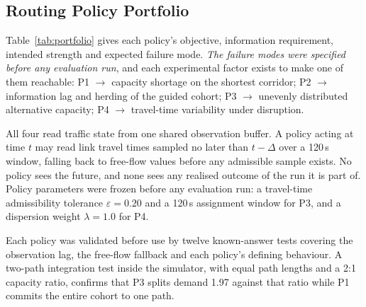 \documentclass[runningheads]{llncs}
\begin{document}
\subsection{Routing Policy Portfolio}

Table~\ref{tab:portfolio} gives each policy's objective, information
requirement, intended strength and expected failure mode. \emph{The failure
modes were specified before any evaluation run}, and each experimental factor
exists to make one of them reachable: P1 $\rightarrow$ capacity shortage on the
shortest corridor; P2 $\rightarrow$ information lag and herding of the guided
cohort; P3 $\rightarrow$ unevenly distributed alternative capacity;
P4 $\rightarrow$ travel-time variability under disruption.

All four read traffic state from one shared observation buffer. A policy acting
at time $t$ may read link travel times sampled no later than $t-\Delta$ over a
120\,s window, falling back to free-flow values before any admissible sample
exists. No policy sees the future, and none sees any realised outcome of the
run it is part of. Policy parameters were frozen before any evaluation run: a
travel-time admissibility tolerance $\varepsilon=0.20$ and a 120\,s
assignment window for P3, and a dispersion weight $\lambda=1.0$ for P4.

Each policy was validated before use by twelve known-answer tests covering the
observation lag, the free-flow fallback and each policy's defining behaviour. A
two-path integration test inside the simulator, with equal path lengths and a
2:1 capacity ratio, confirms that P3 splits demand 1.97 against
that ratio while P1 commits the entire cohort to one path.
\end{document}
